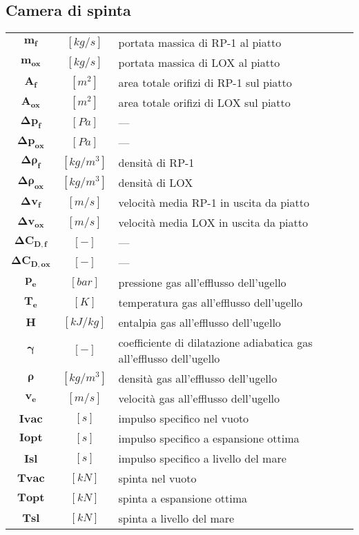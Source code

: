 \begin{multicols}{2}
	\subsection{Camera di spinta}
	\begin{tabularx}{\linewidth}{ccX}
		$\bm{m_f}$ & $[kg/s]$ & portata massica di RP-1 al piatto \\
		$\bm{m_{ox}}$ & $[kg/s]$ & portata massica di LOX al piatto \\
		$\bm{A_f}$ & $[m^2]$ & area totale orifizi di RP-1 sul piatto \\
		$\bm{A_{ox}}$ & $[m^2]$ & area totale orifizi di LOX sul piatto \\
		$\bm{\Delta p_f}$ & $[Pa]$ & --- \\
		$\bm{\Delta p_{ox}}$ & $[Pa]$ & --- \\
		$\bm{\Delta \rho_f}$ & $[kg/m^3]$ & densità di RP-1 \\
		$\bm{\Delta \rho_{ox}}$ & $[kg/m^3]$ & densità di LOX \\
		$\bm{\Delta v_f}$ & $[m/s]$ & velocità media RP-1 in uscita da piatto \\
		$\bm{\Delta v_{ox}}$ & $[m/s]$ & velocità media LOX in uscita da piatto \\
		$\bm{\Delta C_{D,f}}$ & $[-]$ & --- \\
		$\bm{\Delta C_{D,ox}}$ & $[-]$ & --- \\
		$\bm{p_e}$ & $[bar]$ & pressione gas all'efflusso dell'ugello \\
		$\bm{T_e}$ & $[K]$ & temperatura gas all'efflusso dell'ugello \\
		$\bm{H}$ & $[kJ/kg]$ & entalpia gas all'efflusso dell'ugello \\
		$\bm{\gamma}$ & $[-]$ & coefficiente di dilatazione adiabatica gas all'efflusso dell'ugello \\
		$\bm{\rho}$ & $[kg/m^3]$ & densità gas all'efflusso dell'ugello \\
		$\bm{v_e}$ & $[m/s]$ & velocità gas all'efflusso dell'ugello \\
		$\bm{I{vac}}$ & $[s]$ & impulso specifico nel vuoto \\
		$\bm{I{opt}}$ & $[s]$ & impulso specifico a espansione ottima \\
		$\bm{I{sl}}$ & $[s]$ & impulso specifico a livello del mare \\
		$\bm{T{vac}}$ & $[kN]$ & spinta nel vuoto \\
		$\bm{T{opt}}$ & $[kN]$ & spinta a espansione ottima \\
		$\bm{T{sl}}$ & $[kN]$ & spinta a livello del mare
	\end{tabularx}


\end{multicols}
